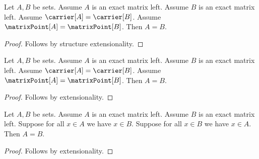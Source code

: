 

\begin{proposition}\label{exact_record_extensionality}
    Let $A,B$ be sets.
    Assume $A$ is an exact matrix left.
    Assume $B$ is an exact matrix left.
    Assume $\carrier[A]=\carrier[B]$.
    Assume $\matrixPoint[A]=\matrixPoint[B]$.
    Then $A=B$.
\end{proposition}
\begin{proof}
    Follows by structure extensionality.
\end{proof}

\begin{proposition}\label{generic_record_extensionality}
    Let $A,B$ be sets.
    Assume $A$ is an exact matrix left.
    Assume $B$ is an exact matrix left.
    Assume $\carrier[A]=\carrier[B]$.
    Assume $\matrixPoint[A]=\matrixPoint[B]$.
    Then $A=B$.
\end{proposition}
\begin{proof}
    Follows by extensionality.
\end{proof}

\begin{proposition}\label{generic_record_falls_back_to_set}
    Let $A,B$ be sets.
    Assume $A$ is an exact matrix left.
    Assume $B$ is an exact matrix left.
    Suppose for all $x\in A$ we have $x\in B$.
    Suppose for all $x\in B$ we have $x\in A$.
    Then $A=B$.
\end{proposition}
\begin{proof}
    Follows by extensionality.
\end{proof}
